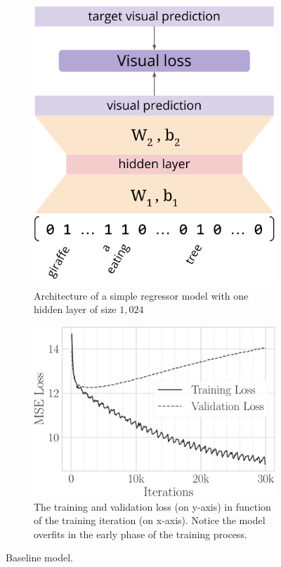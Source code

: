 \begin{figure}
\begin{subfigure}{0.37\textwidth}
\includegraphics[width=\linewidth]{visreg-arch}
\caption{Architecture of a simple regressor model with one hidden layer of size $1,024$}
\label{fig:t2v:visreg:arch}
\end{subfigure}
\hfill
\begin{subfigure}{0.55\textwidth}
\includegraphics[width=\linewidth]{visreg-loss}
\caption{The training and validation loss (on y-axis) in function of the training iteration (on x-axis).
Notice the model overfits in the early phase of the training process.}
\label{fig:t2v:visreg:loss}
\end{subfigure}
\caption{Baseline \visreg{} model. }
\label{fig:t2v:visreg}
\end{figure}


